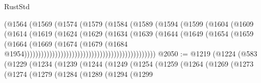 \begin{lexlean}{RustStd}
\begin{coremodule}
{\begin{coremodule}
{{{{{{{{{{{{{{                                                (@1564
                                                  (@1569
                                                    (@1574
                                                      (@1579
                                                        (@1584
                                                          (@1589
                                                            (@1594
                                                              (@1599
                                                                (@1604
                                                                  (@1609
                                                                    (@1614
                                                                      (@1619
                                                                        (@1624
                                                                          (@1629
                                                                            (@1634
                                                                              (@1639
                                                                                (@1644
                                                                                  (@1649
                                                                                    (@1654
                                                                                      (@1659
                                                                                        (@1664
                                                                                          (@1669
                                                                                            (@1674
                                                                                              (@1679
                                                                                                (@1684
                                                                                                  @1954)))))))))))))))))))))))))))))))))))))))))))))))
@2050 := @1219
    (@1224
      (@583
        (@1229
          (@1234
            (@1239
              (@1244
                (@1249
                  (@1254
                    (@1259
                      (@1264
                        (@1269
                          (@1273
                            (@1274
                              (@1279
                                (@1284
                                  (@1289
                                    (@1294
                                      (@1299
}}}}}}}}}}}}}}
\end{coremodule}}
\end{coremodule}
\end{lexlean}
